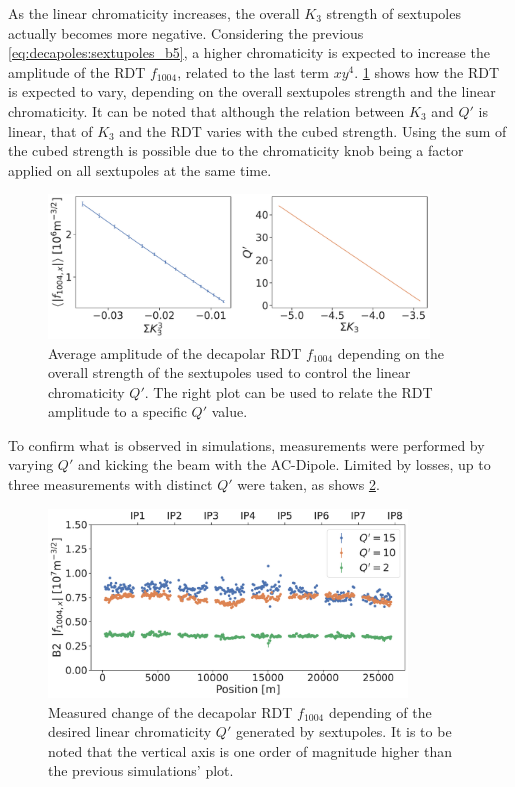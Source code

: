 As the linear chromaticity increases, the overall $K_3$ strength of sextupoles actually becomes 
more negative. Considering the previous \cref{eq:decapoles:sextupoles_b5}, a higher chromaticity
is expected to increase the amplitude of the RDT $f_{1004}$, related to the last term $xy^4$.
\cref{fig:decapoles:sextupoles_k3_f1004} shows how the RDT is expected to vary, depending on the
overall sextupoles strength and the linear chromaticity. It can be noted that although the relation
between $K_3$ and $Q'$ is linear, that of $K_3$ and the RDT varies with the cubed strength. Using 
the sum of the cubed strength is possible due to the chromaticity knob being a factor applied on all
sextupoles at the same time.

\begin{figure}[!htb]
    \centering
    \includegraphics[width=0.9\textwidth]{./images/f1004/avg_f1004_k3.pdf}
    \caption{Average amplitude of the decapolar RDT $f_{1004}$ depending on the overall strength
    of the sextupoles used to control the linear chromaticity $Q'$. The right plot can be used
    to relate the RDT amplitude to a specific $Q'$ value.}
    \label{fig:decapoles:sextupoles_k3_f1004}
\end{figure}


To confirm what is observed in simulations, measurements were performed by varying $Q'$ and kicking
the beam with the AC-Dipole. Limited by losses, up to three measurements with distinct $Q'$ were
taken, as shows \cref{fig:decapoles:rdts:measured_f1004_from_sextupoles}.

\begin{figure}[!htb]
    \centering
    \includegraphics[width=0.85\textwidth]{./images/f1004/f1004x_q2_q10_q15.pdf}
    \caption{Measured change of the decapolar RDT $f_{1004}$ depending of the desired linear
    chromaticity $Q'$ generated by sextupoles. It is to be noted that the vertical axis is one
    order of magnitude higher than the previous simulations' plot.
    }
    \label{fig:decapoles:rdts:measured_f1004_from_sextupoles}
\end{figure}

